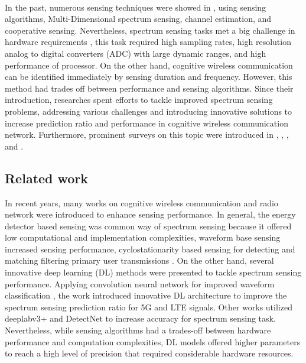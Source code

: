 \documentclass[journal]{IEEEtran} %
\begin{document}
\\
\indent 
In the past, numerous sensing techniques were showed in \cite{YucekSpectrumSensing}, using sensing algorithms, Multi-Dimensional spectrum sensing, channel estimation, and cooperative sensing. Nevertheless, spectrum sensing tasks met a big challenge in hardware requirements \cite{YucekSpectrumSensing}, this task required high sampling rates, high resolution analog to digital converters (ADC) with large dynamic ranges, and high performance of processor. On the other hand, cognitive wireless communication can be identified immediately by sensing duration and frequency. However, this method had trades off between performance and sensing algorithms. Since their introduction, researches spent efforts to tackle improved spectrum sensing problems, addressing various challenges and introducing innovative solutions to increase prediction ratio and performance in cognitive wireless communication network. Furthermore, prominent surveys on this topic were introduced in \cite{kumar2024analysis}, \cite{YucekSpectrumSensing}, \cite{ali2016advances}, and \cite{liyanaarachchi2021optimized}.


\subsection{Related work}
In recent years, many works on cognitive wireless communication and radio network  were introduced to enhance sensing performance. In general, the energy detector based sensing was common way of spectrum sensing because it offered low computational and implementation complexities, waveform base sensing increased sensing performance, cyclostationarity based sensing for detecting and matching filtering  primary user transmissions \cite{YucekSpectrumSensing}. On the other hand, several innovative deep learning (DL) methods were presented to tackle spectrum sensing performance. Applying convolution neural network for improved waveform classification \cite{huynh2024improved}, the work \cite{huynhthe2023intelligence} introduced innovative DL architecture to improve the spectrum sensing prediction ratio for 5G and LTE signals. Other works utilized deeplabv3+ \cite{nguyen2023accurate} and DetectNet \cite{gao2019deep} to increase accuracy for spectrum sensing task. Nevertheless, while sensing algorithms had a trades-off between hardware performance and computation complexities, DL models offered higher parameters to reach a high level of precision that required considerable hardware resources.
\end{document}
